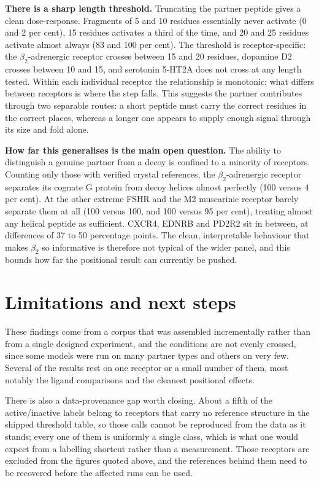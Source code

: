 \documentclass[11pt,a4paper]{article}
\begin{document}
\textbf{There is a sharp length threshold.} Truncating the partner peptide gives a clean
dose-response. Fragments of 5 and 10 residues essentially never activate (0 and 2 per cent), 15
residues activates a third of the time, and 20 and 25 residues activate almost always (83 and 100
per cent). The threshold is receptor-specific: the $\beta_2$-adrenergic receptor crosses between 15
and 20 residues, dopamine D2 crosses between 10 and 15, and serotonin 5-HT2A does not cross at any
length tested. Within each individual receptor the relationship is monotonic; what differs between
receptors is where the step falls. This suggests the partner contributes through two separable
routes: a short peptide must carry the correct residues in the correct places, whereas a longer
one appears to supply enough signal through its size and fold alone.

\textbf{How far this generalises is the main open question.} The ability to distinguish a genuine
partner from a decoy is confined to a minority of receptors. Counting only those with verified
crystal references, the $\beta_2$-adrenergic receptor separates its cognate G protein from decoy
helices almost perfectly (100 versus 4 per cent). At the other extreme FSHR and the M2 muscarinic
receptor barely separate them at all (100 versus 100, and 100 versus 95 per cent), treating almost
any helical peptide as sufficient. CXCR4, EDNRB and PD2R2 sit in between, at differences of 37 to
50 percentage points. The clean, interpretable behaviour that makes $\beta_2$ so informative is
therefore not typical of the wider panel, and this bounds how far the positional result can
currently be pushed.

\section*{Limitations and next steps}

These findings come from a corpus that was assembled incrementally rather than from a single
designed experiment, and the conditions are not evenly crossed, since some models were run on many
partner types and others on very few. Several of the results rest on one receptor or a small number
of them, most notably the ligand comparisons and the cleanest positional effects.

There is also a data-provenance gap worth closing. About a fifth of the active/inactive labels
belong to receptors that carry no reference structure in the shipped threshold table, so those calls
cannot be reproduced from the data as it stands; every one of them is uniformly a single class,
which is what one would expect from a labelling shortcut rather than a measurement. Those receptors
are excluded from the figures quoted above, and the references behind them need to be recovered
before the affected runs can be used.
\end{document}
